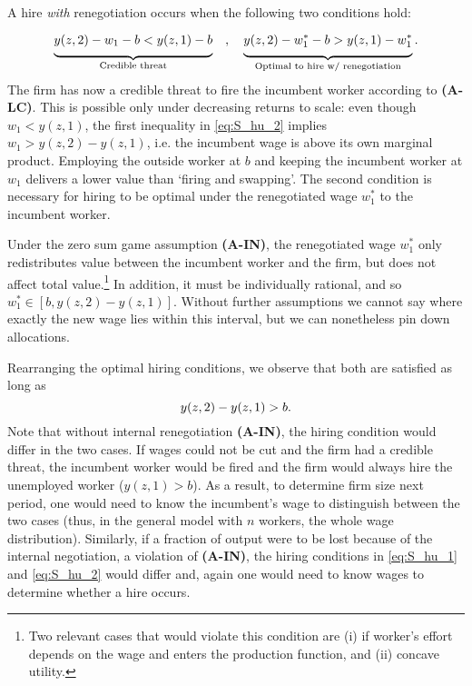A hire \emph{with} renegotiation occurs when the following two conditions hold:
\vspace*{-.3cm}\begin{equation}
\underbrace{\Big.
y(z,2) - w_1 - b < y(z,1) - b
\Big.}_{\text{Credible threat}}  \quad,\quad
\underbrace{\Big.
y(z,2) - w_1^* - b > y(z,1) - w_1^*
\Big.}_{\text{Optimal to hire w/ renegotiation}} .  \label{eq:S_hu_2}
\vspace*{-.3cm}\end{equation}
The firm has now a credible threat to fire the incumbent worker according to \textbf{(A-LC)}. This is possible only under decreasing returns to scale: even though $w_1<y(z,1)$, the first inequality in \eqref{eq:S_hu_2} implies $w_1>y(z,2)-y(z,1)$, i.e. the incumbent wage is above its own marginal product. Employing the outside worker at $b$ and keeping the incumbent worker at $w_{1}$ delivers a lower value than `firing and swapping'. The second condition is necessary for hiring to be optimal under the renegotiated wage $w_1^*$ to the incumbent worker.

Under the zero sum game assumption \textbf{(A-IN)}, the renegotiated wage $w_1^*$ only redistributes value between the incumbent worker and the firm, but does not affect total value.\footnote{Two relevant cases that would violate this condition are
    (i) if worker's effort depends on the wage and enters the production function, and
    (ii) concave utility.} In addition, it must be individually rational, and so $w_1^\ast\in[b,y(z,2)-y(z,1)]$. Without further assumptions we cannot say where exactly the new wage lies within this interval, but we can nonetheless pin down allocations.

Rearranging the optimal hiring conditions, we observe that both are satisfied as long as
\vspace*{-.3cm}\begin{equation}
y(z,2)-y(z,1)>b. \label{eq:S_hu_3}
\vspace*{-.3cm}\end{equation}
Note that without internal renegotiation {\bf(A-IN)}, the hiring condition would differ in the two cases. If wages could not be cut and the firm had a credible threat, the incumbent worker would be fired and the firm would always hire the unemployed worker ($y(z,1)>b$). As a result, to determine firm size next period, one would need to know the incumbent's wage to distinguish between the two cases (thus, in the general model with $n$ workers, the whole wage distribution). Similarly, if a fraction of output were to be lost because of the internal negotiation, a violation of {\bf(A-IN)}, the hiring conditions in \eqref{eq:S_hu_1} and \eqref{eq:S_hu_2} would differ and, again one would need to know wages to determine whether a hire occurs.


